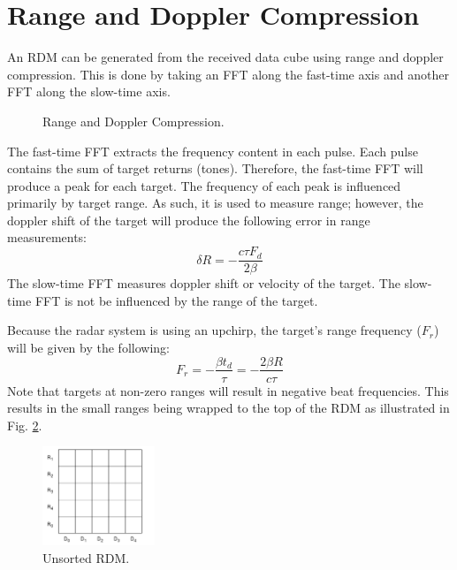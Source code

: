 \documentclass[conference]{IEEEtran}
\begin{document}
\section{Range and Doppler Compression}
An RDM can be generated from the received data cube using range and doppler compression. This is done by taking an FFT along the fast-time axis and another FFT along the slow-time axis.
\begin{figure}[H]
\centerline{}
\caption{Range and Doppler Compression.}
\label{range_doppler_compression_bd}
\end{figure}
\noindent
The fast-time FFT extracts the frequency content in each pulse. Each pulse contains the sum of target returns (tones). Therefore, the fast-time FFT will produce a peak for each target. The frequency of each peak is influenced primarily by target range. As such, it is used to measure range; however, the doppler shift of the target will produce the following error in range measurements:
\begin{equation}
\delta R = -\frac{c\tau F_d}{2\beta}
\end{equation}
The slow-time FFT measures doppler shift or velocity of the target. The slow-time FFT is not be influenced by the range of the target.
\par
Because the radar system is using an upchirp, the target's range frequency ($F_r$) will be given by the following: 
\begin{equation}
F_r = -\frac{\beta t_d}{\tau} = -\frac{2\beta R}{c\tau}
\end{equation}
Note that targets at non-zero ranges will result in negative beat frequencies. This results in the small ranges being wrapped to the top of the RDM as illustrated in Fig. \ref{unsorted_rdm}.
\begin{figure}[H]
\centerline{\includegraphics[width=0.3\textwidth]{unsorted_rdm.png}}
\caption{Unsorted RDM.}
\label{unsorted_rdm}
\end{figure}
\end{document}
